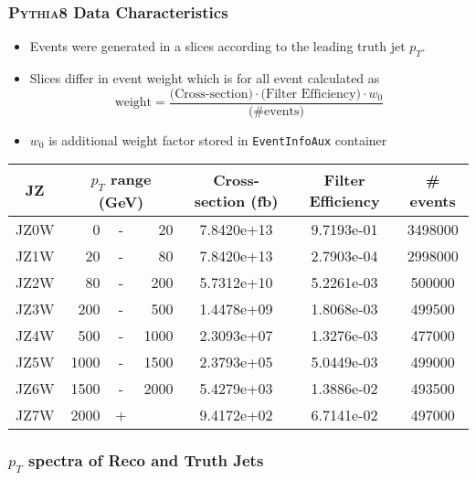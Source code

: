 \documentclass[compress]{beamer}
\newcommand{\pt}{p_{T}}
\begin{document}
\begin{frame}
\frametitle{\textsc{Pythia8} Data Characteristics}
\begin{itemize}
  \item Events were generated in a slices according to the leading truth
      jet $\pt$.
  \item Slices differ in event weight which is for all event calculated as
  \begin{equation*}
    \text{weight} = \frac{\text{(Cross-section)} \cdot \text{(Filter
      Efficiency)} \cdot w_0}{\text{(\# events)}} 
    \end{equation*}
  \item $w_0$ is additional weight factor stored in \texttt{EventInfoAux}
    container
\end{itemize}
  \small
  \begin{table}
  \centering
  \begin{tabular}{|c|rcr|c|c|c|}
    \hline 
     JZ & \multicolumn{3}{|c|}{$\pt$ range (GeV)} & Cross-section (fb) & Filter Efficiency & \# events  \\ 
    \hline
    \hline
		 JZ0W &     0 & - &    20 & 7.8420e+13 & 9.7193e-01 & 3498000 \\ 
    \hline
		 JZ1W &    20 & - &    80 & 7.8420e+13 & 2.7903e-04 & 2998000 \\
    \hline
		 JZ2W &    80 & - &   200 & 5.7312e+10 & 5.2261e-03 & 500000  \\
    \hline
		 JZ3W &   200 & - &   500 & 1.4478e+09 & 1.8068e-03 & 499500  \\
    \hline
		 JZ4W &   500 & - &  1000 & 2.3093e+07 & 1.3276e-03 & 477000  \\
    \hline
		 JZ5W &  1000 & - &  1500 & 2.3793e+05 & 5.0449e-03 & 499000  \\
    \hline
		 JZ6W &  1500 & - &  2000 & 5.4279e+03 & 1.3886e-02 & 493500  \\
    \hline
		 JZ7W &  2000 & + &       & 9.4172e+02 & 6.7141e-02 & 497000  \\
    \hline 
  \end{tabular}
\end{table}
\normalsize
\end{frame}

\begin{frame}
\frametitle{$\pt$ spectra of Reco and Truth Jets}
\begin{columns}[onlytextwidth]
  \begin{column}{0.5\textwidth}
    \begin{figure}[H]
    \centering
    Reco Spectra
    \texttt{[image: \{ptSignalAllRapidityBins]}.eps}
    \end{figure}
  \end{column}
  \begin{column}{0.5\textwidth}
    \begin{figure}[H]
      \centering
    Truth Spectra
    \texttt{[image: \{ptTruthAllRapidityBins]}.eps}
    \end{figure}
  \end{column}
\end{columns}
\end{frame}
\end{document}
